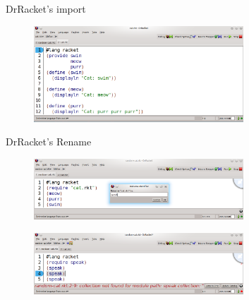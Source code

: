 \documentclass[xcolor=dvipsnames]{beamer}
\begin{document}
\begin{frame}{DrRacket's import}
\begin{figure}[htbp]
  \centering
  \includegraphics[width=0.7\textwidth]{img/cat-definition.png}
  \label{fig:renameBefore}
\end{figure}
\end{frame}
\begin{frame}{DrRacket's Rename}
\begin{figure}[htbp]
  \centering
  \includegraphics[width=0.7\textwidth]{img/renameV2-1.png}
  \label{fig:renameBefore}
\end{figure}

\begin{figure}[htbp]
  \centering
  \includegraphics[width=0.7\textwidth]{img/rename-error.png}
  \label{fig:RacketBug}
\end{figure}
\end{frame}
\end{document}
